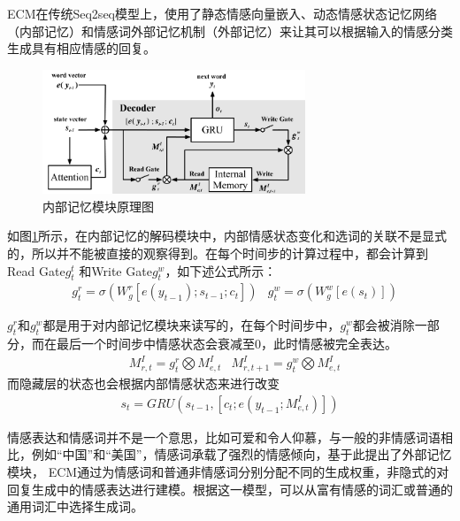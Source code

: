 \documentclass[supercite]{HustGraduPaper}
\theoremstyle{definition}
\begin{document}
ECM在传统Seq2seq模型上，使用了静态情感向量嵌入、动态情感状态记忆网络（内部记忆）和情感词外部记忆机制（外部记忆）来让其可以根据输入的情感分类
生成具有相应情感的回复。
\begin{figure}[H] %
  \centering %
  \includegraphics[width=0.7\textwidth]{images/imemory.png} %
  \caption{内部记忆模块原理图} %
  \label{Fig.imemory} %
\end{figure}

如图\ref{Fig.imemory}所示，在内部记忆的解码模块中，内部情感状态变化和选词的关联不是显式的，所以并不能被直接的观察得到。在每个时间步的计算过程中，都会计算到Read Gate$g_t^t$
和Write Gate$g_t^w$，如下述公式所示：
\begin{align}
  &g_t^r = \sigma(W_g^r[e(y_{t-1});s_{t-1};c_t])
  &g_t^w = \sigma(W_g^w[e(s_t)])
\end{align}

$g_t^r$和$g_t^w$都是用于对内部记忆模块来读写的，在每个时间步中，$g_t^w$都会被消除一部分，而在最后一个时间步中情感状态会衰减至0，此时情感被完全表达。
\begin{align}
  &M_{r,t}^I = g_t^r \bigotimes M_{e,t}^I
  &M_{r,t+1}^I = g_t^w \bigotimes M_{e,t}^I
\end{align}
而隐藏层的状态也会根据内部情感状态来进行改变
\begin{align}
  s_t = GRU(s_{t-1},[c_t;e(y_{t-1};M_{e,t}^I)])
\end{align}

情感表达和情感词并不是一个意思，比如可爱和令人仰慕，与一般的非情感词语相比，例如“中国”和“美国”，情感词承载了强烈的情感倾向，基于此提出了外部记忆模块，
ECM通过为情感词和普通非情感词分别分配不同的生成权重，非隐式的对回复生成中的情感表达进行建模。根据这一模型，可以从富有情感的词汇或普通的通用词汇中选择生成词。
\end{document}
